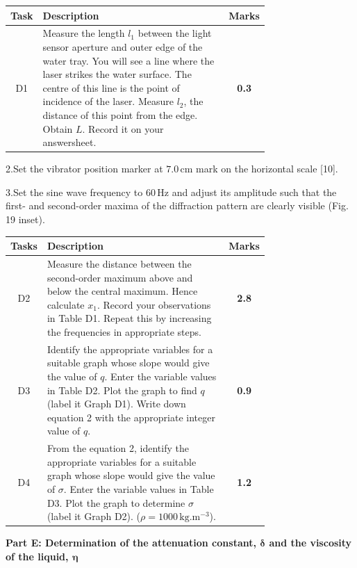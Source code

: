 \begin{center}
\begin{tabular}{|c|p{0.74\linewidth}|c|}
\hline
Task & \centering Description & Marks \\ \hline
D1 & Measure the length $l_1$ between the light sensor aperture and outer edge
of the water tray. You will see a line where the laser strikes the water
surface. The centre of this line is the point of incidence of the laser.
Measure $l_2$, the distance of this point from the edge. Obtain $L$. Record it
on your answersheet. & \textbf{0.3} \\ \hline
\end{tabular}
\end{center}

2.\quad Set the vibrator position marker at $7.0\,\mathrm{cm}$ mark on the
horizontal scale [10].

3.\quad Set the sine wave frequency to $60\,\mathrm{Hz}$ and adjust its
amplitude such that the first- and second-order maxima of the diffraction
pattern are clearly visible (Fig. 19 inset).

\begin{center}
\begin{tabular}{|c|p{0.74\linewidth}|c|}
\hline
Tasks & \centering Description & Marks \\ \hline
D2 & Measure the distance between the second-order maximum above and below the
central maximum. Hence calculate $x_1$. Record your observations in Table D1.
Repeat this by increasing the frequencies in appropriate steps. & \textbf{2.8} \\ \hline
D3 & Identify the appropriate variables for a suitable graph whose slope would
give the value of $q$. Enter the variable values in Table D2. Plot the graph to
find $q$ (label it Graph D1). Write down equation 2 with the appropriate
integer value of $q$. & \textbf{0.9} \\ \hline
D4 & From the equation 2, identify the appropriate variables for a suitable
graph whose slope would give the value of $\sigma$. Enter the variable values
in Table D3. Plot the graph to determine $\sigma$ (label it Graph D2).
($\rho = 1000\,\mathrm{kg.m^{-3}}$). & \textbf{1.2} \\ \hline
\end{tabular}
\end{center}

\textbf{Part E: Determination of the attenuation constant,
$\boldsymbol{\delta}$ and the viscosity of the liquid, $\boldsymbol{\eta}$}

